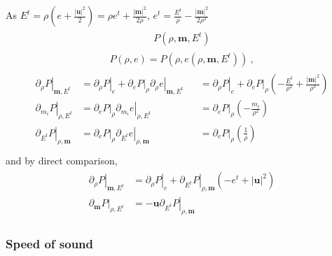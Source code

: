 \documentclass[letterpaper,10pt,english]{jupyterBook}
\begin{document}
\sphinxAtStartPar
As \(E^t = \rho \left( e + \frac{|\mathbf{u}|^2}{2} \right) = \rho e^t + \frac{|\mathbf{m}|^2}{2 \rho} \), \(e^t = \frac{E^t}{\rho} - \frac{|\mathbf{m}|^2}{2 \rho^2}\)
\begin{equation*}
\begin{split}\begin{aligned}
  P(\rho, \mathbf{m}, E^t)
\end{aligned}\end{split}
\end{equation*}\begin{equation*}
\begin{split}P(\rho, e) = P\left( \rho, e\left(\rho, \mathbf{m}, E^t \right) \right) \ ,\end{split}
\end{equation*}\begin{equation*}
\begin{split}\begin{aligned}
  \left.\partial_\rho  P \right|_{\mathbf{m}, E^t}
  & = \left.\partial_{\rho} P \right|_e + \left. \partial_e P \right|_{\rho} \left.\partial_{\rho} e\right|_{\mathbf{m}, E^t}
 && = \left.\partial_{\rho} P \right|_e + \left. \partial_e P \right|_{\rho} \left( - \frac{E^t}{\rho^2} + \frac{|\mathbf{m}|^2}{\rho^3} \right)  \\
  \left.\partial_{m_i} P \right|_{\rho      , E^t}
  & = \left. \partial_e P \right|_{\rho} \left.\partial_{m_i} e\right|_{\rho      , E^t}
 && = \left. \partial_e P \right|_{\rho} \left( - \frac{m_i}{\rho^2} \right) \\
  \left.\partial_{E^t} P \right|_{\rho,\mathbf{m}}
  & = \left. \partial_e P \right|_{\rho} \left.\partial_{E^t} e\right|_{\rho,\mathbf{m}} 
 && = \left. \partial_e P \right|_{\rho} \left( \frac{1}{\rho} \right) \\
\end{aligned}\end{split}
\end{equation*}
\sphinxAtStartPar
and by direct comparison,
\begin{equation*}
\begin{split}\begin{aligned}
  \left.\partial_\rho  P \right|_{\mathbf{m}, E^t}
  & = \left.\partial_{\rho} P \right|_e + \left. \partial_{E^t} P \right|_{\rho,\mathbf{m}} \left( -e^t + |\mathbf{u}|^2 \right)  \\
  \left.\partial_{\mathbf{m}} P \right|_{\rho      , E^t}
  & = - \mathbf{u} \left. \partial_{E^t} P \right|_{\rho, \mathbf{m}} 
\end{aligned}\end{split}
\end{equation*}\subsubsection*{Speed of sound}
\end{document}
